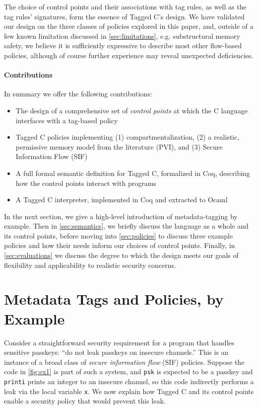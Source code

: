 \documentclass{llncs}
\begin{document}
The choice of control points and their associations with tag rules, as well as the tag rules'
signatures, form the essence of Tagged C's design. 
We have validated our design on the three classes of policies explored in this paper,
and, outside of a few known limitation discussed in \cref{sec:limitations}, e.g. substructural memory safety,
we believe it is sufficiently expressive to describe most other flow-based policies, although
of course further experience may reveal unexpected deficiencies. 

\paragraph{Contributions}

In summary we offer the following contributions:

\begin{itemize}
\item The design of a comprehensive set of {\em control points} at which the C language interfaces with a tag-based policy
\item Tagged C policies implementing (1) compartmentalization,
  (2) a realistic, permissive memory model from the literature (PVI),
  and (3) Secure Information Flow (SIF)
\item A full formal semantic definition for Tagged C, formalized in Coq, describing how the control points
  interact with programs
\item A Tagged C interpreter, implemented in Coq and extracted to Ocaml
\end{itemize}

In the next section, we give a high-level introduction of metadata-tagging by example.
Then in \cref{sec:semantics}, we briefly discuss the language as a whole and its control points,
before moving into \cref{sec:policies} to discuss three example policies and how their
needs inform our choices of control points. Finally, in
\cref{sec:evaluations} we discuss the degree to
which the design meets our goals of flexibility and applicability to realistic
security concerns.

\section{Metadata Tags and Policies, by Example}

Consider a straightforward security requirement for a program that handles sensitive passkeys:
``do not leak passkeys on insecure channels.'' This is an instance of a broad class of
{\em secure information flow} (SIF) policies. Suppose the code in \cref{fig:ex1} is part of
such a system, and {\tt psk} is expected to be a passkey and {\tt printi}
prints an integer to an insecure channel, so this code indirectly performs a leak via the
local variable {\tt x}. We now explain how Tagged C and its control points
enable a security policy that would prevent this leak.
\end{document}
